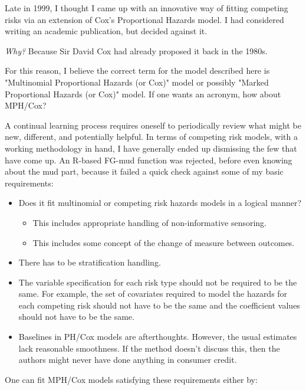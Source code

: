 \documentclass[10pt]{article}
\begin{document}
Late in 1999, I thought I came up with an innovative way 
of fitting competing risks via an extension of Cox's
Proportional Hazards model.   I had considered writing an academic publication,  but decided against it.  
\begin{center}
    {\em Why?}  Because Sir David Cox had already proposed it back in the 1980s. 
\end{center}
For this reason, I believe the correct term for the model described here is "Multinomial Proportional Hazards (or Cox)" model
or possibly "Marked Proportional Hazards (or Cox)" model.  If one wants an acronym, how about MPH/Cox?

A continual learning process requires oneself to 
periodically review what might be new, different, and potentially helpful.
In terms of competing risk models, with a working methodology in hand, I have generally ended up dismissing 
the few that have come up.  
An R-based FG-mud function was rejected, before even knowing about the mud part, because it failed 
a quick check against some of my basic requirements:
\begin{itemize}
\item Does it fit multinomial or competing risk hazards models in a logical manner?
\begin{itemize}
\item This includes appropriate handling of non-informative sensoring.
\item This includes some concept of the change of measure between outcomes.
\end{itemize}
\item There has to be stratification handling. 
\item The variable specification for each risk type should not be required to be the same.
For example, the set of covariates required to model the hazards for each competing risk should
not have to be the same and the coefficient values should not have to be the same.
\item Baselines in PH/Cox models are afterthoughts. However, the usual estimates 
    lack reasonable smoothness.  If the method doesn't discuss this, then the authors might 
    never have done anything in consumer credit.
\end{itemize}
One can fit MPH/Cox models satisfying these requirements either by:
\end{document}
